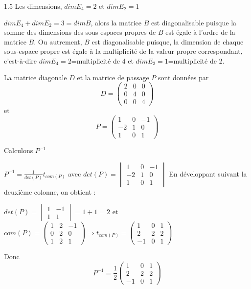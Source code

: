 \documentclass[12pt]{article}
\begin{document}
\begin{spacing}{1.5}
Les dimensions, $dimE_4=2$ et $dimE_2=1$

$dimE_4+dimE_2=3=dimB$, alors la matrice $B$ est diagonalisable puisque la somme des dimensions des sous-espaces propres de $B$ est égale à l'ordre de la matrice $B$. Ou autrement, $B$ est diagonalisable puisque, la dimension de chaque sous-espace propre est égale à la multiplicité de la valeur propre correspondant, c'est-à-dire $dimE_4=2$=multiplicité de 4 et $dimE_2=1$=multiplicité de 2.

\medskip
La matrice diagonale $D$ et la matrice de passage $P$ sont données par \[
D=\begin{pmatrix}
2 & 0 & 0 \\ 
0 & 4 & 0 \\ 
0 & 0 & 4
\end{pmatrix} \] et \[P=\begin{pmatrix}
1 & 0 & -1 \\ 
-2 & 1 & 0 \\ 
1 & 0 & 1
\end{pmatrix} 
\]

\medskip Calculons $P^{-1}$

$P^{-1}=\frac{1}{det(P)}t_{com(P)}$ avec $det(P)=\begin{vmatrix}
1 & 0 & -1 \\ 
-2 & 1 & 0 \\ 
1 & 0 & 1
\end{vmatrix}$ En développant suivant la deuxième colonne, on obtient :

$det(P)=\begin{vmatrix}
1 & -1\\
1 & 1
\end{vmatrix}=1+1=2$ et  $com(P)=\begin{pmatrix}
1 & 2 & -1 \\ 
0 & 2 & 0 \\ 
1 & 2 & 1
\end{pmatrix} \Rightarrow t_{com(P)}=\begin{pmatrix}
1 & 0 & 1 \\ 
2 & 2 & 2 \\ 
-1 & 0 & 1
\end{pmatrix}$

Donc \[P^{-1}=\frac{1}{2}\begin{pmatrix}
1 & 0 & 1 \\ 
2 & 2 & 2 \\ 
-1 & 0 & 1
\end{pmatrix}\]




\end{spacing}
\end{document}
